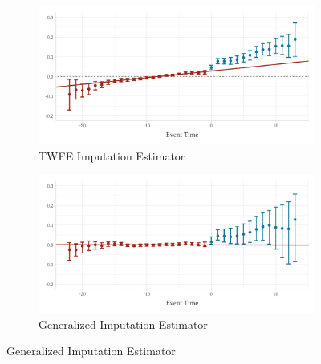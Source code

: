 \begin{figure}
\caption{Effect of Walmart on County $\log$ Retail Employment}
\label{fig:walmart_retail}

\begin{center}
\begin{subfigure}[b]{0.75\textwidth}
  \caption{TWFE Imputation Estimator}
  \begin{adjustbox}{width=\textwidth, center}
    \includegraphics{figures/generalized/did2s_retail.pdf}
  \end{adjustbox}
\end{subfigure}
\end{center}
\begin{center}
\begin{subfigure}[b]{0.75\textwidth}
  \caption{Generalized Imputation Estimator}
  \begin{adjustbox}{width=\textwidth, center}
    \includegraphics{figures/generalized/qld_retail.pdf}
  \end{adjustbox}
\end{subfigure}
\end{center}


\end{figure}

